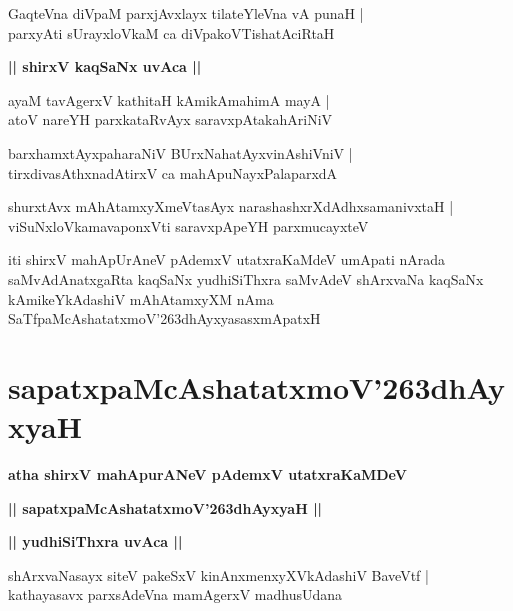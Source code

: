 \documentclass[twoside,12pt,openright]{book}
\def\S{\char'263}
\newcounter{shloka}[chapter]
\def\uvaca#1{\centerline{{\large\textbf{#1}}}}
\begin{document}
\begin{shloka}%
GaqteVna diVpaM parxjAvxlayx tilateYleVna vA punaH |\\
parxyAti sUrayxloVkaM ca diVpakoVTishatAciRtaH
\end{shloka}

\uvaca{|| shirxV kaqSaNx uvAca ||}

\begin{shloka}%
ayaM tavAgerxV kathitaH kAmikAmahimA mayA |\\
atoV nareYH parxkataRvAyx saravxpAtakahAriNiV
\end{shloka}

\begin{shloka}%
barxhamxtAyxpaharaNiV BUrxNahatAyxvinAshiVniV |\\
tirxdivasAthxnadAtirxV ca mahApuNayxPalaparxdA
\end{shloka}

\begin{shloka}%
shurxtAvx mAhAtamxyXmeVtasAyx narashashxrXdAdhxsamanivxtaH |\\
viSuNxloVkamavaponxVti saravxpApeYH parxmucayxteV
\end{shloka}

\begin{center}
iti shirxV mahApUrAneV pAdemxV utatxraKaMdeV umApati nArada saMvAdAnatxgaRta kaqSaNx yudhiSiThxra 
saMvAdeV shArxvaNa kaqSaNx kAmikeYkAdashiV mAhAtamxyXM nAma SaTfpaMcAshatatxmoV\S dhAyxyasasxmApatxH
\end{center}

\chapter{sapatxpaMcAshatatxmoV\S dhAyxyaH}

\begin{center}
{\LARGE\bfseries atha shirxV mahApurANeV pAdemxV utatxraKaMDeV}
\end{center}

\begin{center}
{\LARGE\bfseries || sapatxpaMcAshatatxmoV\S dhAyxyaH ||}
\end{center}

\uvaca{|| yudhiSiThxra uvAca ||}

\begin{shloka}%
shArxvaNasayx siteV pakeSxV kinAnxmenxyXVkAdashiV BaveVtf |\\
kathayasavx parxsAdeVna mamAgerxV madhusUdana
\end{shloka}
\end{document}
